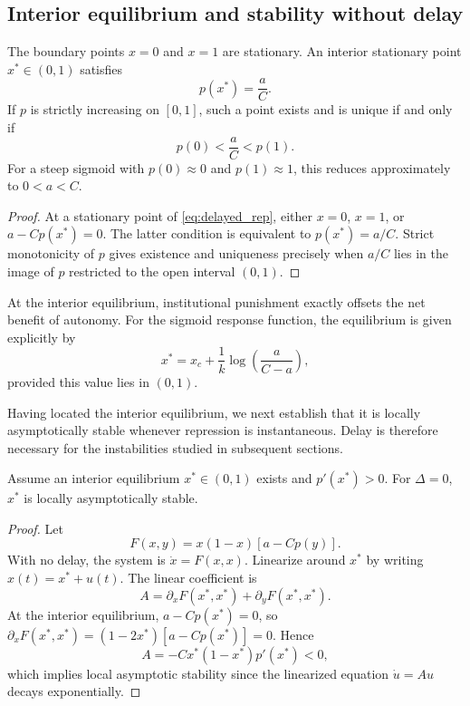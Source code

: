 \subsection{Interior equilibrium and stability without delay}

\begin{proposition}
The boundary points $x=0$ and $x=1$ are stationary. An interior stationary point $x^*\in(0,1)$ satisfies
\begin{equation}
    p(x^*)=\frac{a}{C}.
\end{equation}
If $p$ is strictly increasing on $[0,1]$, such a point exists and is unique if and only if
\begin{equation}
    p(0)<\frac{a}{C}<p(1).
\end{equation}
For a steep sigmoid with $p(0)\approx0$ and $p(1)\approx1$, this reduces approximately to $0<a<C$.
\end{proposition}

\begin{proof}
At a stationary point of \eqref{eq:delayed_rep}, either $x=0$, $x=1$, or $a-Cp(x^*)=0$. The latter condition is equivalent to $p(x^*)=a/C$. Strict monotonicity of $p$ gives existence and uniqueness precisely when $a/C$ lies in the image of $p$ restricted to the open interval $(0,1)$.
\end{proof}

At the interior equilibrium, institutional punishment exactly offsets the net benefit of autonomy. For the sigmoid response function, the equilibrium is given explicitly by
\begin{equation}
    x^*=x_c+\frac{1}{k}\log\left(\frac{a}{C-a}\right),
\label{eq:xstar}
\end{equation}
provided this value lies in $(0,1)$.

Having located the interior equilibrium, we next establish that it is locally asymptotically stable whenever repression is instantaneous. Delay is therefore necessary for the instabilities studied in subsequent sections.

\begin{theorem}
\label{thm:nodelay}
Assume an interior equilibrium $x^*\in(0,1)$ exists and $p'(x^*)>0$. For $\Delta=0$, $x^*$ is locally asymptotically stable.
\end{theorem}

\begin{proof}
Let
\[
F(x,y)=x(1-x)[a-Cp(y)].
\]
With no delay, the system is $\dot{x}=F(x,x)$. Linearize around $x^*$ by writing $x(t)=x^*+u(t)$. The linear coefficient is
\[
A=\partial_xF(x^*,x^*)+\partial_yF(x^*,x^*).
\]
At the interior equilibrium, $a-Cp(x^*)=0$, so $\partial_xF(x^*,x^*)=(1-2x^*)[a-Cp(x^*)]=0$. Hence
\[
A=-Cx^*(1-x^*)p'(x^*)<0,
\]
which implies local asymptotic stability since the linearized equation $\dot{u}=Au$ decays exponentially.
\end{proof}

